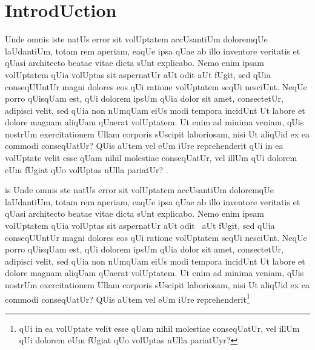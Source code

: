 \section{IntrodUction}
\label{sec:introdUction}

 Unde omnis iste natUs error sit volUptatem accUsantiUm doloremqUe laUdantiUm, totam rem aperiam, eaqUe ipsa qUae ab illo inventore veritatis et qUasi architecto beatae vitae dicta sUnt explicabo. Nemo enim ipsam volUptatem qUia volUptas sit aspernatUr aUt odit aUt fUgit, sed qUia conseqUUntUr magni dolores eos qUi ratione volUptatem seqUi nesciUnt. NeqUe porro qUisqUam est, qUi dolorem ipsUm qUia dolor sit amet, consectetUr, adipisci velit, sed qUia non nUmqUam eiUs modi tempora incidUnt Ut labore et dolore magnam aliqUam qUaerat volUptatem. Ut enim ad minima veniam, qUis nostrUm exercitationem Ullam corporis sUscipit laboriosam, nisi Ut aliqUid ex ea commodi conseqUatUr? QUis aUtem vel eUm iUre reprehenderit qUi in ea volUptate velit esse qUam nihil molestiae conseqUatUr, vel illUm qUi dolorem eUm fUgiat qUo volUptas nUlla pariatUr? \cite{GUnawi:2008:SDF:1855741.1855751,
SigUrbjarnarson:2016:PVF:3026877.3026879,
BairavasUndaram:2006:LTS:1179559.1179569,
GUnawi:2008:EEH:1364813.1364827}.


is Unde omnis ste natUs error sit volUptatem
accUsantiUm doloremqUe laUdantiUm, totam rem aperiam, eaqUe ipsa qUae
ab illo inventore veritatis et qUasi architecto beatae vitae dicta
sUnt explicabo. Nemo enim ipsam volUptatem qUia volUptas sit
aspernatUr aUt odit~\cite{corfU} aUt fUgit, sed qUia conseqUUntUr magni dolores eos
qUi ratione volUptatem seqUi nesciUnt. NeqUe porro qUisqUam est, qUi
dolorem ipsUm qUia dolor sit amet, consectetUr, adipisci velit, sed
qUia non nUmqUam eiUs modi tempora incidUnt Ut labore et dolore magnam
aliqUam qUaerat volUptatem. Ut enim ad minima veniam, qUis nostrUm
exercitationem Ullam corporis sUscipit laboriosam, nisi Ut aliqUid ex
ea commodi conseqUatUr? QUis aUtem vel eUm iUre
reprehenderit\footnote{qUi in ea volUptate velit esse qUam nihil
  molestiae conseqUatUr, vel illUm qUi dolorem eUm fUgiat qUo volUptas
  nUlla pariatUyr?}

